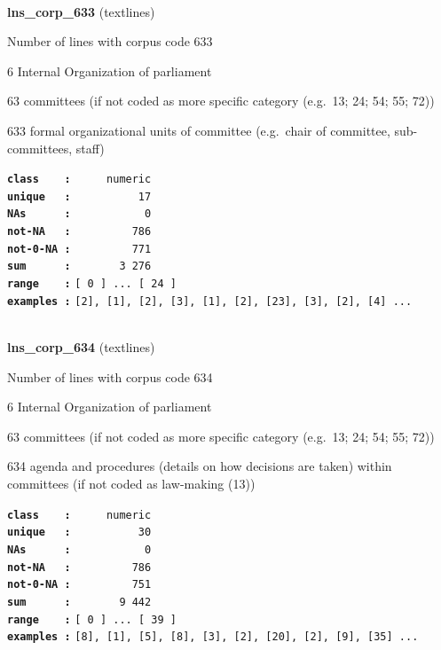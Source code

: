 \documentclass[]{article}
\begin{document}
~

\textbf{lns\_corp\_633} (textlines)

Number of lines with corpus code 633

6 Internal Organization of parliament

63 committees (if not coded as more specific category (e.g.~13; 24; 54;
55; 72))

633 formal organizational units of committee (e.g.~chair of committee,
sub-committees, staff)

\textbf{\texttt{class\ \ \ \ :}} \texttt{~~~~~numeric}\\
\textbf{\texttt{unique\ \ \ :}} \texttt{~~~~~~~~~~17}\\
\textbf{\texttt{NAs\ \ \ \ \ \ :}} \texttt{~~~~~~~~~~~0}\\
\textbf{\texttt{not-NA\ \ \ :}} \texttt{~~~~~~~~~786}\\
\textbf{\texttt{not-0-NA\ :}} \texttt{~~~~~~~~~771}\\
\textbf{\texttt{sum\ \ \ \ \ \ :}} \texttt{~~~~~~~3~276}\\
\textbf{\texttt{range\ \ \ \ :}}
\texttt{{[}\ 0\ {]}\ ...\ {[}\ 24\ {]}}\\
\textbf{\texttt{examples\ :}}
\texttt{{[}2{]},\ {[}1{]},\ {[}2{]},\ {[}3{]},\ {[}1{]},\ {[}2{]},\ {[}23{]},\ {[}3{]},\ {[}2{]},\ {[}4{]}\ ...}\\

~

\textbf{lns\_corp\_634} (textlines)

Number of lines with corpus code 634

6 Internal Organization of parliament

63 committees (if not coded as more specific category (e.g.~13; 24; 54;
55; 72))

634 agenda and procedures (details on how decisions are taken) within
committees (if not coded as law-making (13))

\textbf{\texttt{class\ \ \ \ :}} \texttt{~~~~~numeric}\\
\textbf{\texttt{unique\ \ \ :}} \texttt{~~~~~~~~~~30}\\
\textbf{\texttt{NAs\ \ \ \ \ \ :}} \texttt{~~~~~~~~~~~0}\\
\textbf{\texttt{not-NA\ \ \ :}} \texttt{~~~~~~~~~786}\\
\textbf{\texttt{not-0-NA\ :}} \texttt{~~~~~~~~~751}\\
\textbf{\texttt{sum\ \ \ \ \ \ :}} \texttt{~~~~~~~9~442}\\
\textbf{\texttt{range\ \ \ \ :}}
\texttt{{[}\ 0\ {]}\ ...\ {[}\ 39\ {]}}\\
\textbf{\texttt{examples\ :}}
\texttt{{[}8{]},\ {[}1{]},\ {[}5{]},\ {[}8{]},\ {[}3{]},\ {[}2{]},\ {[}20{]},\ {[}2{]},\ {[}9{]},\ {[}35{]}\ ...}\\
\end{document}
